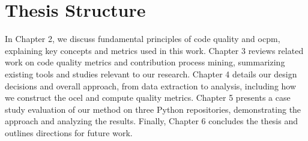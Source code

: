 \section{Thesis Structure}
In Chapter 2, we discuss fundamental principles of code quality and \ac{ocpm}, explaining key concepts and metrics used in this work. Chapter 3 reviews related work on code quality metrics and contribution process mining, summarizing existing tools and studies relevant to our research. Chapter 4 details our design decisions and overall approach, from data extraction to analysis, including how we construct the \ac{ocel} and compute quality metrics. Chapter 5 presents a case study evaluation of our method on three Python repositories, demonstrating the approach and analyzing the results. Finally, Chapter 6 concludes the thesis and outlines directions for future work.
